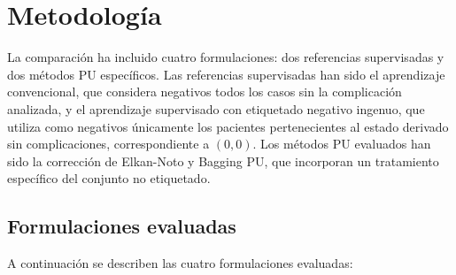 \section{Metodología}

La comparación ha incluido cuatro formulaciones: dos referencias supervisadas y dos métodos PU específicos. Las referencias supervisadas han sido el aprendizaje convencional, que considera negativos todos los casos sin la complicación analizada, y el aprendizaje supervisado con etiquetado negativo ingenuo, que utiliza como negativos únicamente los pacientes pertenecientes al estado derivado sin complicaciones, correspondiente a \((0,0)\). Los métodos PU evaluados han sido la corrección de Elkan-Noto y Bagging PU, que incorporan un tratamiento específico del conjunto no etiquetado.

\subsection{Formulaciones evaluadas}

A continuación se describen las cuatro formulaciones evaluadas:



